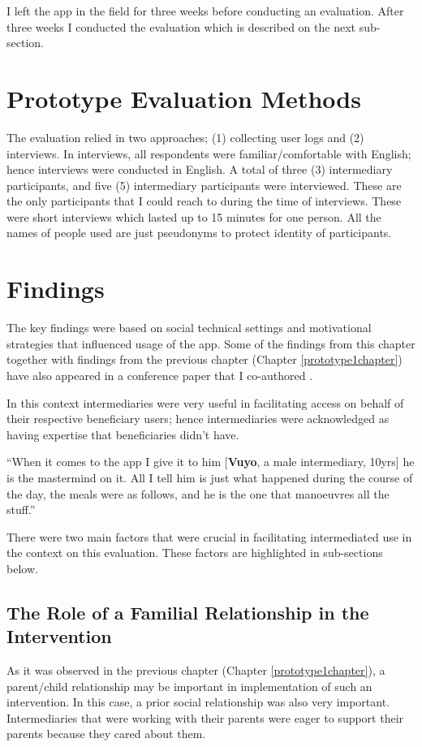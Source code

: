 I left the app in the field for three weeks before conducting an evaluation. After three weeks I conducted the evaluation which is described on the next sub-section.
\section{Prototype Evaluation Methods}
The evaluation relied in two approaches; (1) collecting user logs and (2) interviews. In interviews, all respondents were familiar/comfortable with English; hence interviews were conducted in English. A total of three (3) intermediary participants, and five (5) intermediary participants were interviewed. These are the only participants that I could reach to during the time of interviews. These were short interviews which lasted up to 15 minutes for one person. All the names of people used are just pseudonyms to protect identity of participants. 
\section{Findings}
The key findings were based on social technical settings and motivational strategies that influenced usage of the app. Some of the findings from this chapter together with findings from the previous chapter (Chapter \ref{prototype1chapter}) have also appeared in a conference paper that I co-authored \citep{katule2016leveraging}.

In this context intermediaries were very useful in facilitating access on behalf of their respective beneficiary users; hence intermediaries were acknowledged as having expertise that beneficiaries didn't have. 

 {``When it comes to the app I give it to him [\textbf{Vuyo}, a male intermediary, 10yrs] he is the mastermind on it. All I tell him is just what happened during the course of the day, the meals were as follows, and he is the one that manoeuvres all the stuff.''} 

There were two main factors that were crucial in facilitating intermediated use in the context on this evaluation. These factors are highlighted in sub-sections below.

\subsection{The Role of a Familial Relationship in the Intervention}
As it was observed in the previous chapter (Chapter \ref{prototype1chapter}), a parent/child relationship may be important in implementation of such an intervention. In this case, a prior social relationship was also very important. Intermediaries that were working with their parents were eager to support their parents because they cared about them. 

